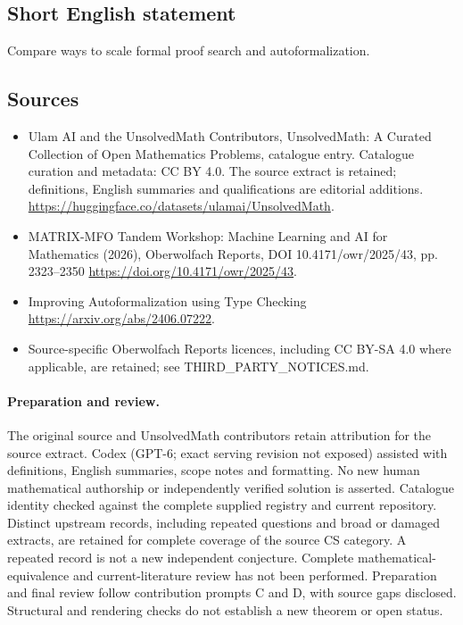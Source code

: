 \documentclass[11pt]{article}
\begin{document}
\subsection{Short English statement}
Compare ways to scale formal proof search and autoformalization.
\subsection{Sources}
\begin{itemize}
\item[\hypertarget{source:statement:1}{S1}] Ulam AI and the UnsolvedMath Contributors, UnsolvedMath: A Curated Collection of Open Mathematics Problems, catalogue entry. Catalogue curation and metadata: CC BY 4.0. The source extract is retained; definitions, English summaries and qualifications are editorial additions.
\url{https://huggingface.co/datasets/ulamai/UnsolvedMath}.
\item[\hypertarget{source:statement:2}{S2}] MATRIX-MFO Tandem Workshop: Machine Learning and AI for Mathematics (2026), Oberwolfach Reports, DOI 10.4171/owr/2025/43, pp. 2323--2350
\url{https://doi.org/10.4171/owr/2025/43}.
\item[\hypertarget{source:statement:3}{S3}] Improving Autoformalization using Type Checking
\url{https://arxiv.org/abs/2406.07222}.
\item Source-specific Oberwolfach Reports licences, including CC BY-SA 4.0 where applicable, are retained; see THIRD\_PARTY\_NOTICES.md.
\end{itemize}
\paragraph{Preparation and review.}
The original source and UnsolvedMath contributors retain attribution for the source extract. Codex (GPT-6; exact serving revision not exposed) assisted with definitions, English summaries, scope notes and formatting. No new human mathematical authorship or independently verified solution is asserted. Catalogue identity checked against the complete supplied registry and current repository. Distinct upstream records, including repeated questions and broad or damaged extracts, are retained for complete coverage of the source CS category. A repeated record is not a new independent conjecture. Complete mathematical-equivalence and current-literature review has not been performed. Preparation and final review follow contribution prompts C and D, with source gaps disclosed. Structural and rendering checks do not establish a new theorem or open status.
\label{end:statement}
\end{document}

